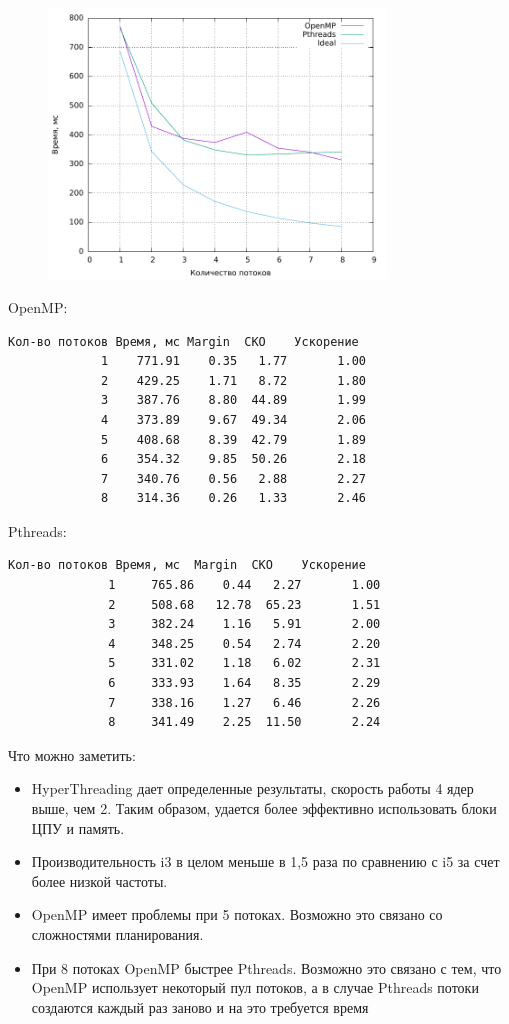 \begin{figure}[H]
	\centering
	\includegraphics[width=0.8\textwidth]{../plot_laptop/plotAll.pdf}
	\caption{}
\end{figure}

OpenMP:
\begin{verbatim}
Кол-во потоков Время, мс Margin  СКО    Ускорение  
             1    771.91    0.35   1.77       1.00
             2    429.25    1.71   8.72       1.80
             3    387.76    8.80  44.89       1.99
             4    373.89    9.67  49.34       2.06
             5    408.68    8.39  42.79       1.89
             6    354.32    9.85  50.26       2.18
             7    340.76    0.56   2.88       2.27
             8    314.36    0.26   1.33       2.46
\end{verbatim}

Pthreads:
\begin{verbatim}
Кол-во потоков Время, мс  Margin  СКО    Ускорение  
              1     765.86    0.44   2.27       1.00
              2     508.68   12.78  65.23       1.51
              3     382.24    1.16   5.91       2.00
              4     348.25    0.54   2.74       2.20
              5     331.02    1.18   6.02       2.31
              6     333.93    1.64   8.35       2.29
              7     338.16    1.27   6.46       2.26
              8     341.49    2.25  11.50       2.24
\end{verbatim}

Что можно заметить:
\begin{itemize}
	\item HyperThreading дает определенные результаты, скорость работы 4 ядер выше, чем 2. Таким образом, удается более эффективно использовать блоки ЦПУ и память.
	\item Производительность i3 в целом меньше в 1,5 раза по сравнению с i5 за счет более низкой частоты.
	\item OpenMP имеет проблемы при 5 потоках. Возможно это связано со сложностями планирования.
	\item При 8 потоках OpenMP быстрее Pthreads. Возможно это связано с тем, что OpenMP использует некоторый пул потоков, а в случае Pthreads потоки создаются каждый раз заново и на это требуется время
\end{itemize}

